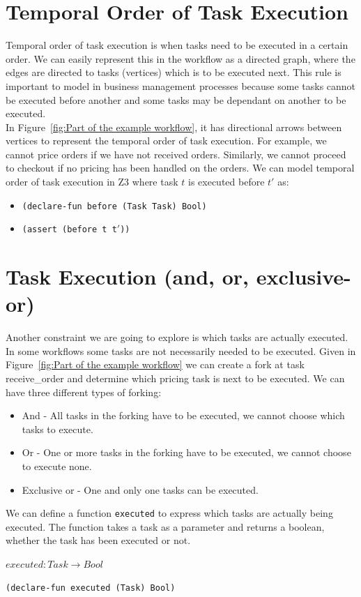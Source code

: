 \documentclass[a4paper]{report}
\begin{document}
\section{Temporal Order of Task Execution}
Temporal order of task execution is when tasks need to be executed in a certain order. We can easily represent this in the workflow as a directed graph, where the edges are directed to tasks (vertices) which is to be executed next. This rule is important to model in business management processes because some tasks cannot be executed before another and some tasks may be dependant on another to be executed. \\

In Figure~\ref{fig:Part of the example workflow}, it has directional arrows between vertices to represent the temporal order of task execution. For example, we cannot price orders if we have not received orders. Similarly, we cannot proceed to checkout if no pricing has been handled on the orders. We can model temporal order of task execution in Z3 where task $t$ is executed before $t\ensuremath{'}$ as:
\begin{itemize}
\item \texttt{(declare-fun before (Task Task) Bool)}
\item \texttt{(assert (before t t\ensuremath{'}))}
\end{itemize}

\section{Task Execution (and, or, exclusive-or)}
Another constraint we are going to explore is which tasks are actually executed. In some workflows some tasks are not necessarily needed to be executed. Given in Figure~\ref{fig:Part of the example workflow} we can create a fork at task receive\_order and determine which pricing task is next to be executed. We can have three different types of forking:
\begin{itemize}
\item And - All tasks in the forking have to be executed, we cannot choose which tasks to execute.
\item Or - One or more tasks in the forking have to be executed, we cannot choose to execute none.
\item Exclusive or - One and only one tasks can be executed.
\end{itemize}

We can define a function \texttt{executed} to express which tasks are actually being executed. The function takes a task as a parameter and returns a boolean, whether the task has been executed or not.
\begin{center}
$executed : Task \longrightarrow Bool$
\end{center}
\begin{lstlisting}[frame=single]
(declare-fun executed (Task) Bool)
\end{lstlisting}
\end{document}
